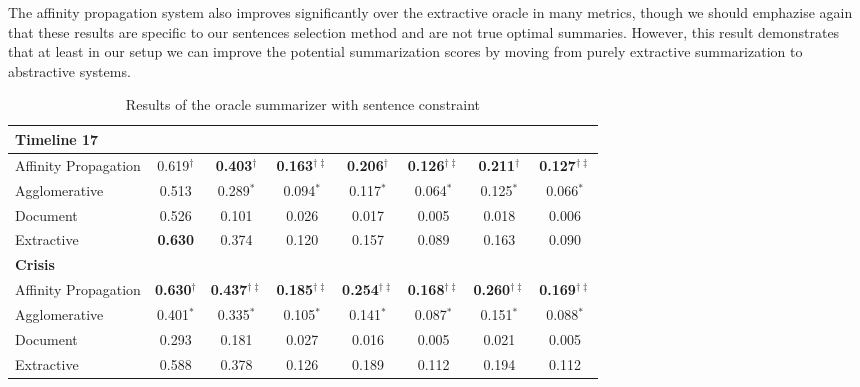 \documentclass[a4paper,BCOR=10mm]{report}
\numberwithin{lemma}{chapter}
\numberwithin{definition}{chapter}
\begin{document}
The affinity propagation system also improves significantly over the extractive oracle in many metrics, though we should emphazise again that these results are specific to our sentences selection method and are not true optimal summaries. However, this result demonstrates that at least in our setup we can improve the potential summarization scores by moving from purely extractive summarization to abstractive systems.

\begin{table}
\begin{tabular}{|l|ccccccc|}
\hline
\multicolumn{8}{|l|}{\textbf{Timeline 17}}\\\hline
Affinity Propagation & 0.619$^{\dagger}$&\textbf{0.403}$^{\dagger}$&\textbf{0.163}$^{\dagger\ddagger}$&\textbf{0.206}$^{\dagger}$&\textbf{0.126}$^{\dagger\ddagger}$&\textbf{0.211}$^{\dagger}$&\textbf{0.127}$^{\dagger\ddagger}$\\\hline
Agglomerative & 0.513&0.289$^{*}$&0.094$^{*}$&0.117$^{*}$&0.064$^{*}$&0.125$^{*}$&0.066$^{*}$\\\hline
Document & 0.526&0.101&0.026&0.017&0.005&0.018&0.006\\\hline
Extractive & \textbf{0.630}&0.374&0.120&0.157&0.089&0.163&0.090\\\hline
\hline\multicolumn{8}{|l|}{\textbf{Crisis}}\\\hline
Affinity Propagation & \textbf{0.630}$^{\dagger}$&\textbf{0.437}$^{\dagger\ddagger}$&\textbf{0.185}$^{\dagger\ddagger}$&\textbf{0.254}$^{\dagger\ddagger}$&\textbf{0.168}$^{\dagger\ddagger}$&\textbf{0.260}$^{\dagger\ddagger}$&\textbf{0.169}$^{\dagger\ddagger}$\\\hline
Agglomerative & 0.401$^{*}$&0.335$^{*}$&0.105$^{*}$&0.141$^{*}$&0.087$^{*}$&0.151$^{*}$&0.088$^{*}$\\\hline
Document & 0.293&0.181&0.027&0.016&0.005&0.021&0.005\\\hline
Extractive & 0.588&0.378&0.126&0.189&0.112&0.194&0.112\\\hline
\end{tabular}
\caption{Results of the oracle summarizer with sentence constraint}
\label{tab:results-oracle-sent}
\end{table}
\end{document}
